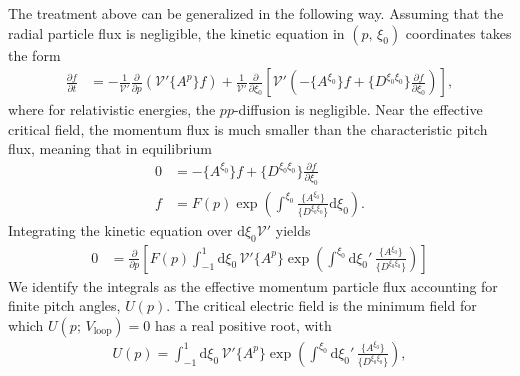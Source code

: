 \documentclass[11pt,a4paper]{article}
\newcommand{\rd}{\ensuremath{\mathrm{d}}}
\newcommand{\sub}[1]{\ensuremath{_{\text{#1}}}}
\begin{document}
The treatment above can be generalized in the following way. Assuming that the radial particle flux is negligible, the kinetic equation in $(p,\,\xi_0)$ coordinates takes the form
\begin{align}
\frac{\partial f}{\partial t} &= -\frac{1}{\mathcal{V}'}\frac{\partial}{\partial p}\left(\mathcal{V'} \{A^p\}f\right) + \frac{1}{\mathcal{V}'}\frac{\partial}{\partial \xi_0}\left[\mathcal{V'}\left( -\{A^{\xi_0}\}f + \{D^{\xi_0\xi_0}\} \frac{\partial f}{\partial \xi_0}\right)\right],
\end{align}
where for relativistic energies, the $pp$-diffusion is negligible. Near the effective critical field, the momentum flux is much smaller than the characteristic pitch flux, meaning that in equilibrium
\begin{align}
0 &= -\{A^{\xi_0}\}f + \{D^{\xi_0\xi_0}\} \frac{\partial f}{\partial \xi_0} \nonumber \\
f &= F(p) \exp\left( \int^{\xi_0}\frac{\{A^{\xi_0}\}}{\{D^{\xi_0\xi_0}\}} \rd \xi_0 \right).
\end{align}
Integrating the kinetic equation over $\rd \xi_0 \mathcal{V'}$ yields
\begin{align}
0 &= \frac{\partial}{\partial p} \left[ F(p) \int_{-1}^1 \rd \xi_0 \, \mathcal{V}'  \{A^p\} \exp\left( \int^{\xi_0} \rd \xi_0' \,\frac{\{A^{\xi_0}\}}{\{D^{\xi_0\xi_0}\}} \right)\right]
\end{align}
We identify the integrals as the effective momentum particle flux accounting for finite pitch angles, $U(p)$. The critical electric field is the minimum field for which $U(p;\,V\sub{loop})=0$ has a real positive root, with
\begin{align}
U(p) =  \int_{-1}^1 \rd \xi_0 \, \mathcal{V}'  \{A^p\} \exp\left(\int^{\xi_0} \rd \xi_0' \, \frac{\{A^{\xi_0}\}}{\{D^{\xi_0\xi_0}\}} \right),
\end{align}
\end{document}
